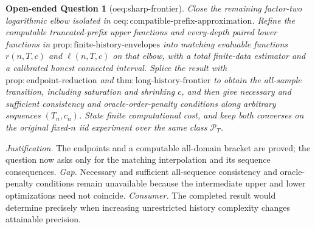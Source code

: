 \documentclass{article}
\newtheorem{openendedquestion}{Open-ended Question}
\begin{document}
\begin{openendedquestion}[oeq:sharp-frontier]\label{oeq:sharp-frontier}
Close the remaining factor-two logarithmic elbow isolated in \(\mathrm{oeq:compatible\text{-}prefix\text{-}approximation}\).  Refine the computable truncated-prefix upper functions and every-depth paired lower functions in \(\mathrm{prop:finite\text{-}history\text{-}envelopes}\) into matching evaluable functions \(r(n,T,c)\) and \(\ell(n,T,c)\) on that elbow, with a total finite-data estimator and a calibrated honest connected interval.  Splice the result with \(\mathrm{prop:endpoint\text{-}reduction}\) and \(\mathrm{thm:long\text{-}history\text{-}frontier}\) to obtain the all-sample transition, including saturation and shrinking \(c\), and then give necessary and sufficient consistency and oracle-order-penalty conditions along arbitrary sequences \((T_n,c_n)\).  State finite computational cost, and keep both converses on the original fixed-\(n\) iid experiment over the same class \(\mathcal P_T\).
\end{openendedquestion}
\par\smallskip\noindent \textit{Justification.} The endpoints and a computable all-domain bracket are proved; the question now asks only for the matching interpolation and its sequence consequences. \textit{Gap.} Necessary and sufficient all-sequence consistency and oracle-penalty conditions remain unavailable because the intermediate upper and lower optimizations need not coincide. \textit{Consumer.} The completed result would determine precisely when increasing unrestricted history complexity changes attainable precision.
\end{document}
